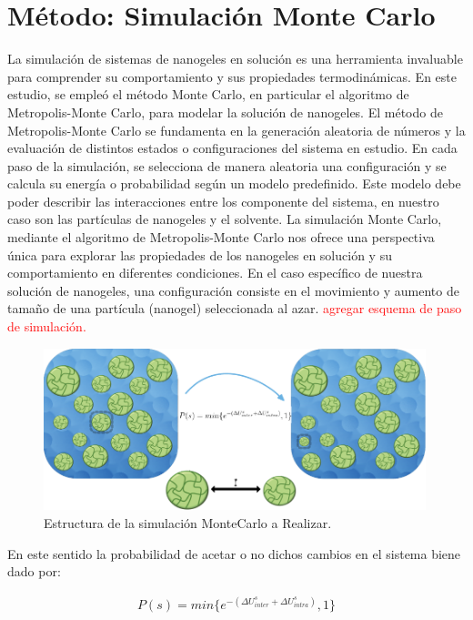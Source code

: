 \section{M\'etodo: Simulaci\'on Monte Carlo}


La simulaci\'on de sistemas de nanogeles en soluci\'on es una herramienta invaluable para comprender su comportamiento y sus propiedades termodin\'amicas. En este estudio, se emple\'o el m\'etodo Monte Carlo, en particular el algoritmo de Metropolis-Monte Carlo, para modelar la soluci\'on de nanogeles.
El m\'etodo de Metropolis-Monte Carlo \addcite se fundamenta en la generaci\'on aleatoria de n\'umeros y la evaluaci\'on de distintos estados o configuraciones del sistema en estudio. En cada paso de la simulaci\'on, se selecciona de manera aleatoria una configuraci\'on y se calcula su energ\'ia o probabilidad seg\'un un modelo predefinido. Este modelo debe poder describir las interacciones entre los componente del sistema, en nuestro caso son las part\'iculas de nanogeles y el solvente.
La simulaci\'on Monte Carlo, mediante el algoritmo de Metropolis-Monte Carlo nos ofrece una perspectiva \'unica para explorar las propiedades de los nanogeles en soluci\'on y su comportamiento en diferentes condiciones. 
En el caso espec\'ifico de nuestra soluci\'on de nanogeles, una configuraci\'on consiste en el movimiento y aumento de tama\~no de una part\'icula (nanogel) seleccionada al azar. 
\textcolor{red}{agregar esquema de paso de simulaci\'on.}

\begin{figure}[!htb]
	\centering
	\includegraphics[width=0.99\textwidth]{Figures/modelos/mc_model.pdf}
	\caption{Estructura de la simulaci\'on MonteCarlo a Realizar.}
	\label{fig:mc:sistema_mc}
\end{figure}
En este sentido la probabilidad de acetar o no dichos cambios en el sistema biene dado por:

\begin{align}
	P(s) = min \{e^{-(\Delta U^s_{inter} + \Delta U^s_{intra})},1\}
\end{align}

